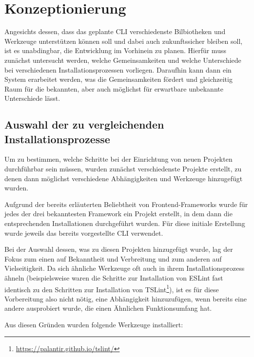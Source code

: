 \section{Konzeptionierung}
\label{komzeptionierung}
Angesichts dessen, dass das geplante \gls{CLI} verschiedenste Bilbiotheken und Werkzeuge unterstützen können soll und dabei auch zukunftssicher bleiben soll, ist es unabdingbar, die Entwicklung im Vorhinein zu planen. Hierfür muss zunächst untersucht werden, welche Gemeinsamkeiten und welche Unterschiede bei verschiedenen Installationsprozessen vorliegen. Daraufhin kann dann ein System erarbeitet werden, was die Gemeinsamkeiten fördert und gleichzeitig Raum für die bekannten, aber auch möglichst für erwartbare unbekannte Unterschiede lässt.

\subsection{Auswahl der zu vergleichenden Installationsprozesse}
Um zu bestimmen, welche Schritte bei der Einrichtung von neuen Projekten durchführbar sein müssen, wurden zunächst verschiedenste Projekte erstellt, zu denen dann möglichst verschiedene Abhängigkeiten und Werkzeuge hinzugefügt wurden.

Aufgrund der bereits erläuterten Beliebtheit von Frontend-Frameworks wurde für jedes der drei bekanntesten Framework ein Projekt erstellt, in dem dann die entsprechenden Installationen durchgeführt wurden. Für diese initiale Erstellung wurde jeweils das bereits vorgestellte \gls{CLI} verwendet.

Bei der Auswahl dessen, was zu diesen Projekten hinzugefügt wurde, lag der Fokus zum einen auf Bekanntheit und Verbreitung und zum anderen auf Vielseitigkeit. Da sich ähnliche Werkzeuge oft auch in ihrem Installationsprozess ähneln (beispielsweise waren die Schritte zur Installation von ESLint fast identisch zu den Schritten zur Installation von TSLint\footnote{\url{https://palantir.github.io/tslint/}}), ist es für diese Vorbereitung also nicht nötig, eine Abhängigkeit hinzuzufügen, wenn bereits eine andere ausprobiert wurde, die einen Ähnlichen Funktionsumfang hat.

Aus diesen Gründen wurden folgende Werkzeuge installiert:

